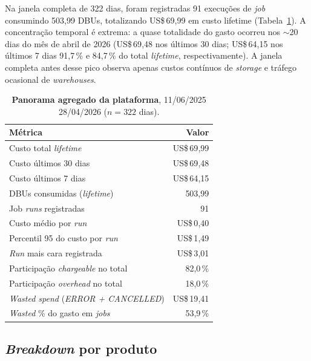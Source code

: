 \documentclass[12pt,a4paper,oneside]{article}
\newcommand{\us}{US\$\,}
\begin{document}
Na janela completa de 322 dias, foram registradas 91 execuções de
\textit{job} consumindo 503,99 DBUs, totalizando \us 69{,}99
em custo lifetime (Tabela~\ref{tab:overview}). A concentração
temporal é extrema: a quase totalidade do gasto ocorreu nos
\(\sim\)20 dias do mês de abril de 2026 (\us 69{,}48 nos últimos
30 dias; \us 64{,}15 nos últimos 7 dias \textemdash{} 91,7\,\% e
84,7\,\% do total \textit{lifetime}, respectivamente). A janela
completa antes desse pico observa apenas custos contínuos de
\textit{storage} e tráfego ocasional de \textit{warehouses}.

\begin{table}[H]
\centering
\caption{\textbf{Panorama agregado da plataforma}, 11/06/2025
        \textendash{} 28/04/2026 (\(n = 322\) dias).}
\label{tab:overview}
\begin{tabular}{lr}
\toprule
\textbf{Métrica} & \textbf{Valor} \\
\midrule
Custo total \textit{lifetime}                         & \us 69{,}99 \\
Custo últimos 30 dias                                 & \us 69{,}48 \\
Custo últimos 7 dias                                  & \us 64{,}15 \\
DBUs consumidas (\textit{lifetime})                   & 503,99 \\
Job \textit{runs} registradas                         & 91 \\
Custo médio por \textit{run}                          & \us 0{,}40 \\
Percentil 95 do custo por \textit{run}                & \us 1{,}49 \\
\textit{Run} mais cara registrada                     & \us 3{,}01 \\
Participação \textit{chargeable} no total             & 82,0\,\% \\
Participação \textit{overhead} no total               & 18,0\,\% \\
\textit{Wasted spend} (\textit{ERROR + CANCELLED})    & \us 19{,}41 \\
\textit{Wasted} \% do gasto em \textit{jobs}          & 53,9\,\% \\
\bottomrule
\end{tabular}
\end{table}

\subsection{\textit{Breakdown} por produto}
\end{document}
